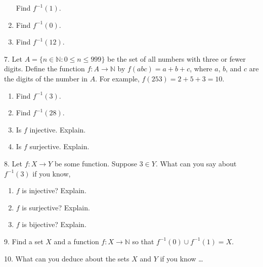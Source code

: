 \documentclass[10pt,]{book}
\theoremstyle{plain}
\theoremstyle{definition}
\theoremstyle{definition}
\theoremstyle{definition}
\numberwithin{equation}{section}
\def\N{\mathbb N}
\def\inv{^{-1}}
\def\st{:}
\begin{document}
\begin{exerciselist}
\begin{enumerate}[label=(\alph*)]
                Find \(f\inv(1)\).
\item\hypertarget{li-324}{}
                Find \(f\inv(0)\).
\item\hypertarget{li-325}{}
                Find \(f\inv(12)\).
\end{enumerate}
\par\smallskip
\item[7.]\hypertarget{exercise-33}{}
            Let \(A = \{n \in \N \st 0 \le n \le 999\}\) be the set of all numbers with three or fewer digits. Define the function \(f:A \to \N\) by \(f(abc) = a+b+c\), where \(a\), \(b\), and \(c\) are the digits of the number in \(A\). For example, \(f(253) = 2 + 5 + 3 =  10\).
\leavevmode%
\begin{enumerate}[label=(\alph*)]
\item\hypertarget{li-331}{}
                Find \(f\inv(3)\).
\item\hypertarget{li-332}{}
                Find \(f\inv(28)\).
\item\hypertarget{li-333}{}
                Is \(f\) injective. Explain.
\item\hypertarget{li-334}{}
                Is \(f\) surjective. Explain.
\end{enumerate}
\par\smallskip
\item[8.]\hypertarget{exercise-34}{}
            Let \(f:X \to Y\) be some function. Suppose \(3 \in Y\). What can you say about \(f\inv(3)\) if you know,
\leavevmode%
\begin{enumerate}[label=(\alph*)]
\item\hypertarget{li-339}{}\(f\) is injective? Explain.%
\item\hypertarget{li-340}{}\(f\) is surjective? Explain.%
\item\hypertarget{li-341}{}\(f\) is bijective? Explain.%
\end{enumerate}
\par\smallskip
\item[9.]\hypertarget{exercise-35}{}
            Find a set \(X\) and a function \(f:X \to \N\) so that \(f\inv(0) \cup f\inv(1) = X\).
\par\smallskip
\item[10.]\hypertarget{exercise-36}{}
            What can you deduce about the sets \(X\) and \(Y\) if you know
            \dots{}
\leavevmode%

\end{exerciselist}
\end{document}
